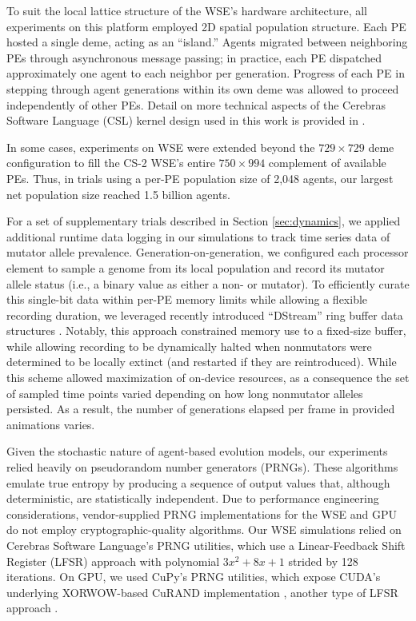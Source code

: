 To suit the local lattice structure of the WSE's hardware architecture, all experiments on this platform employed 2D spatial population structure.
Each PE hosted a single deme, acting as an ``island.''
Agents migrated between neighboring PEs through asynchronous message passing;
in practice, each PE dispatched approximately one agent to each neighbor per generation.
Progress of each PE in stepping through agent generations within its own deme was allowed to proceed independently of other PEs.
Detail on more technical aspects of the Cerebras Software Language (CSL) kernel design used in this work is provided in \citet{moreno2024trackable}.

In some cases, experiments on WSE were extended beyond the $729 \times 729$ deme configuration to fill the CS-2 WSE's entire $750 \times 994$ complement of available PEs.
Thus, in trials using a per-PE population size of 2,048 agents, our largest net population size reached 1.5 billion agents.

For a set of supplementary trials described in Section \ref{sec:dynamics}, we applied additional runtime data logging in our simulations to track time series data of mutator allele prevalence.
Generation-on-generation, we configured each processor element to sample a genome from its local population and record its mutator allele status (i.e., a binary value as either a non- or mutator).
To efficiently curate this single-bit data within per-PE memory limits while allowing a flexible recording duration, we leveraged recently introduced ``DStream'' ring buffer data structures \citep{moreno2024algorithms}.
Notably, this approach constrained memory use to a fixed-size buffer, while allowing recording to be dynamically halted when nonmutators were determined to be locally extinct (and restarted if they are reintroduced).
While this scheme allowed maximization of on-device resources, as a consequence the set of sampled time points varied depending on how long nonmutator alleles persisted.
As a result, the number of generations elapsed per frame in provided animations varies.


Given the stochastic nature of agent-based evolution models, our experiments relied heavily on pseudorandom number generators (PRNGs).
These algorithms emulate true entropy by producing a sequence of output values that, although deterministic, are statistically independent.
Due to performance engineering considerations, vendor-supplied PRNG implementations for the WSE and GPU do not employ cryptographic-quality algorithms.
Our WSE simulations relied on Cerebras Software Language's PRNG utilities, which use a Linear-Feedback Shift Register (LFSR) approach with polynomial $3x^2 + 8x + 1$ strided by 128 iterations.
On GPU, we used CuPy's PRNG utilities, which expose CUDA's underlying XORWOW-based CuRAND implementation \citep{marsaglia2003xorshift}, another type of LFSR approach \citep{brent2004note}.


